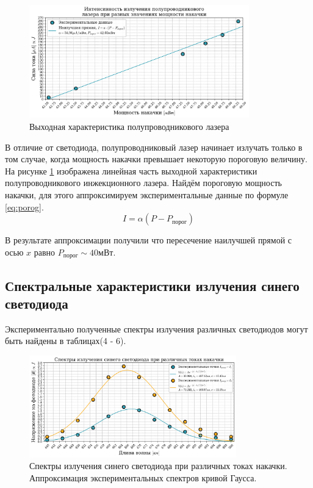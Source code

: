 \documentclass[a4paper, 12pt]{extarticle}
\begin{document}
\begin{figure}[htbp]
    \centering
    \includegraphics[width = 0.85\textwidth]{lazer.png}
    \caption{Выходная характеристика полупроводникового лазера}
    \label{fig:lazer}
\end{figure}

В отличие от светодиода, полупроводниковый лазер начинает излучать только в том случае, когда мощность накачки превышает некоторую пороговую величину. На рисунке \ref{fig:lazer} изображена линейная часть выходной характеристики полупроводникового инжекционного лазера. Найдём пороговую мощность накачки, для этого аппроксимируем экспериментальные данные по формуле \ref{eq:porog}.
\begin{equation}
    I = \alpha (P - P_{\text{порог}}) 
    \label{eq:porog}
\end{equation}

В результате аппроксимации получили что пересечение наилучшей прямой с осью $x$ равно $P_{\text{порог}} \sim 40 \text{мВт}$.

\newpage
\subsection*{\textcolor{sub_header}{Спектральные характеристики излучения синего светодиода}}
 

Экспериментально полученные спектры излучения различных светодиодов могут быть найдены в таблицах(4 - 6).
\begin{figure}[htbp]
    \centering
    \includegraphics[width = 0.8\textwidth]{blue_gauss.png}
    \caption{Спектры излучения синего светодиода при различных токах накачки. Аппроксимация экспериментальных спектров кривой Гаусса.}
    \label{fig:blue_gauss}
\end{figure}
\end{document}

